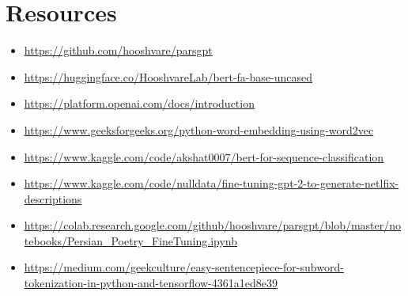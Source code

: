 \documentclass[12pt, letterpaper]{article}
\begin{document}
    \section{Resources}\label{sec:resources}
    \begin{itemize}
    \item \url{https://github.com/hooshvare/parsgpt}
    \item \url{https://huggingface.co/HooshvareLab/bert-fa-base-uncased}
    \item \url{https://platform.openai.com/docs/introduction}
    \item \url{https://www.geeksforgeeks.org/python-word-embedding-using-word2vec}
    \item \url{https://www.kaggle.com/code/akshat0007/bert-for-sequence-classification}
    \item \url{https://www.kaggle.com/code/nulldata/fine-tuning-gpt-2-to-generate-netlfix-descriptions}
    \item \url{https://colab.research.google.com/github/hooshvare/parsgpt/blob/master/notebooks/Persian_Poetry_FineTuning.ipynb}
    \item \url{https://medium.com/geekculture/easy-sentencepiece-for-subword-tokenization-in-python-and-tensorflow-4361a1ed8e39}
    \end{itemize}
\end{document}
